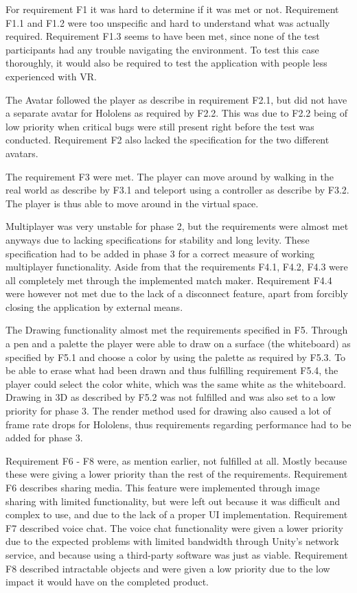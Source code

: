         For requirement F1 it was hard to determine if it was met or not. Requirement F1.1 and F1.2 were too unspecific and hard to understand what was actually required. Requirement F1.3 seems to have been met, since none of the test participants had any trouble navigating the environment. To test this case thoroughly, it would also be required to test the application with people less experienced with VR.
        
        The Avatar followed the player as describe in requirement F2.1, but did not have a separate avatar for Hololens as required by F2.2. This was due to F2.2 being of low priority when critical bugs were still present right before the test was conducted. Requirement F2 also lacked the specification for the two different avatars.
        
        The requirement F3 were met. The player can move around by walking in the real world as describe by F3.1 and teleport using a controller as describe by F3.2. The player is thus able to move around in the virtual space.
        
        Multiplayer was very unstable for phase 2, but the requirements were almost met anyways due to lacking specifications for stability and long levity. These specification had to be added in phase 3 for a correct measure of working multiplayer functionality. Aside from that the requirements F4.1, F4.2, F4.3 were all completely met through the implemented match maker. Requirement F4.4 were however not met due to the lack of a disconnect feature, apart from forcibly closing the application by external means.
        
        The Drawing functionality almost met the requirements specified in F5. Through a pen and a palette the player were able to draw on a surface (the whiteboard) as specified by F5.1 and choose a color by using the palette as required by F5.3. To be able to erase what had been drawn and thus fulfilling requirement F5.4, the player could select the color white, which was the same white as the whiteboard. Drawing in 3D as described by F5.2 was not fulfilled and was also set to a low priority for phase 3. The render method used for drawing also caused a lot of frame rate drops for Hololens, thus requirements regarding performance had to be added for phase 3.
        
        Requirement F6 - F8 were, as mention earlier, not fulfilled at all. Mostly because these were giving a lower priority than the rest of the requirements. Requirement F6 describes sharing media. This feature were implemented through image sharing with limited functionality, but were left out because it was difficult and complex to use, and due to the lack of a proper UI implementation. Requirement F7 described voice chat. The voice chat functionality were given a lower priority due to the expected problems with limited bandwidth through Unity's network service, and because using a third-party software was just as viable. Requirement F8 described intractable objects and were given a low priority due to the low impact it would have on the completed product.
        
